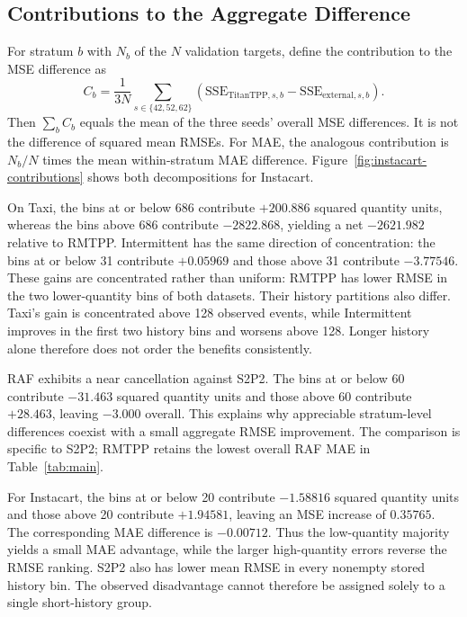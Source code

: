 \documentclass[runningheads]{llncs}
\begin{document}
\subsection{Contributions to the Aggregate Difference}
For stratum $b$ with $N_b$ of the $N$ validation targets, define the
contribution to the MSE difference as
\begin{equation}
 C_b=\frac{1}{3N}\sum_{s\in\{42,52,62\}}
       \left(\mathrm{SSE}_{\mathrm{TitanTPP},s,b}
             -\mathrm{SSE}_{\mathrm{external},s,b}\right).
 \label{eq:mse-contribution}
\end{equation}
Then $\sum_b C_b$ equals the mean of the three seeds' overall MSE
differences. It is not the difference of squared mean RMSEs. For MAE,
the analogous contribution is $N_b/N$ times the mean within-stratum
MAE difference. Figure~\ref{fig:instacart-contributions} shows both
decompositions for Instacart.

On Taxi, the bins at or below 686 contribute $+200.886$ squared quantity
units, whereas the bins above 686 contribute $-2822.868$, yielding a net
$-2621.982$ relative to RMTPP. Intermittent has the same direction of
concentration: the bins at or below 31 contribute $+0.05969$ and those
above 31 contribute $-3.77546$. These gains are concentrated rather than
uniform: RMTPP has lower RMSE in the two lower-quantity bins of both datasets.
Their history partitions also differ. Taxi's gain is concentrated above
128 observed events, while Intermittent improves in the first two history
bins and worsens above 128. Longer history alone therefore does not order
the benefits consistently.

RAF exhibits a near cancellation against S2P2. The bins at or below 60
contribute $-31.463$ squared quantity units and those above 60 contribute
$+28.463$, leaving $-3.000$ overall. This explains why appreciable
stratum-level differences coexist with a small aggregate RMSE improvement.
The comparison is specific to S2P2; RMTPP retains the lowest overall RAF
MAE in Table~\ref{tab:main}.

For Instacart, the bins at or below 20 contribute $-1.58816$ squared
quantity units and those above 20 contribute $+1.94581$, leaving an MSE
increase of $0.35765$. The corresponding MAE difference is $-0.00712$.
Thus the low-quantity majority yields a small MAE advantage, while the
larger high-quantity errors reverse the RMSE ranking. S2P2 also has lower
mean RMSE in every nonempty stored history bin. The observed disadvantage
cannot therefore be assigned solely to a single short-history group.
\end{document}
